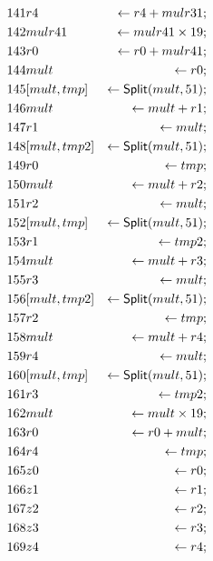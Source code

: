 \begin{align*}
141 & r4 & \leftarrow r4 + mulr31; \\
142 & mulr41 & \leftarrow mulr41 \times 19; \\
143 & r0 & \leftarrow r0 + mulr41; \\
144 & mult & \leftarrow r0; \\
145 & {[}{mult}, {tmp}{]} & \leftarrow \mbox{\textsf{Split}}(mult, 51); \\
146 & mult & \leftarrow mult + r1; \\
147 & r1 & \leftarrow mult; \\
148 & {[}{mult}, {tmp2}{]} & \leftarrow \mbox{\textsf{Split}}(mult, 51); \\
149 & r0 & \leftarrow tmp; \\
150 & mult & \leftarrow mult + r2; \\
151 & r2 & \leftarrow mult; \\
152 & {[}{mult}, {tmp}{]} & \leftarrow \mbox{\textsf{Split}}(mult, 51); \\
153 & r1 & \leftarrow tmp2; \\
154 & mult & \leftarrow mult + r3; \\
155 & r3 & \leftarrow mult; \\
156 & {[}{mult}, {tmp2}{]} & \leftarrow \mbox{\textsf{Split}}(mult, 51); \\
157 & r2 & \leftarrow tmp; \\
158 & mult & \leftarrow mult + r4; \\
159 & r4 & \leftarrow mult; \\
160 & {[}{mult}, {tmp}{]} & \leftarrow \mbox{\textsf{Split}}(mult, 51); \\
161 & r3 & \leftarrow tmp2; \\
162 & mult & \leftarrow mult \times 19; \\
163 & r0 & \leftarrow r0 + mult; \\
164 & r4 & \leftarrow tmp; \\
165 & z0 & \leftarrow r0; \\
166 & z1 & \leftarrow r1; \\
167 & z2 & \leftarrow r2; \\
168 & z3 & \leftarrow r3; \\
169 & z4 & \leftarrow r4; \\
\end{align*}